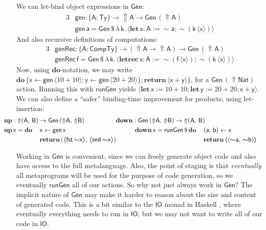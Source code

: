 \documentclass[acmsmall,screen]{acmart}
\newcommand{\mit}[1]{{\mathsf{#1}}}
\newcommand{\msf}[1]{{\mathsf{#1}}}
\newcommand{\mbf}[1]{{\mathbf{#1}}}
\newcommand{\bs}[1]{\boldsymbol{#1}}
\newcommand{\mdo}{\mbf{do}\,}
\newcommand{\ind}{\hspace{1em}}
\newcommand{\return}{\mbf{return}\,}
\newcommand{\lam}{\lambda\,}
\newcommand{\letrec}{\mbf{letrec}\,}
\newcommand{\letdef}{\mbf{let\,}}
\newcommand{\vk}{\mathsf{k}}
\newcommand{\vA}{\mathsf{A}}
\newcommand{\vB}{\mathsf{B}}
\newcommand{\va}{\mathsf{a}}
\newcommand{\vb}{\mathsf{b}}
\newcommand{\vx}{\mathsf{x}}
\newcommand{\vy}{\mathsf{y}}
\newcommand{\vf}{\mathsf{f}}
\newcommand{\fro}{\leftarrow}
\newcommand{\Up}{{\Uparrow}}
\newcommand{\spl}{{\bs{\sim}}}
\newcommand{\ql}{{\bs{\langle}}}
\newcommand{\qr}{{\bs{\rangle}}}
\newcommand{\Ty}{\msf{Ty}}
\newcommand{\CTy}{\msf{CompTy}}
\newcommand{\fst}{\msf{fst}}
\newcommand{\snd}{\msf{snd}}
\newcommand{\Nat}{\msf{Nat}}
\theoremstyle{remark}
\newcommand{\mup}{\mbf{up}}
\newcommand{\mdown}{\mbf{down}}
\newcommand{\Gen}{\msf{Gen}}
\newcommand{\gen}{\mit{gen}}
\newcommand{\genRec}{\mit{genRec}}
\newcommand{\runGen}{\mit{runGen}}
\newcommand{\qt}[1]{\ql#1\qr}
\newcommand{\dlr}{\,\$\,}
\begin{document}
We can let-bind object expressions in $\Gen$:
\begin{alignat*}{3}
  & \gen : \{\vA : \Ty\} \to \Up \vA \to \Gen\,(\Up \vA) \\
  & \gen\,\va = \Gen \dlr \lam \vk.\,\ql \letdef \vx : \vA := \spl \va; \spl(\vk\,\ql \vx \qr) \qr
\end{alignat*}
And also recursive definitions of computations:
\begin{alignat*}{3}
  & \genRec : \{\vA : \CTy\} \to (\Up \vA \to \Up \vA) \to \Gen\,(\Up \vA) \\
  & \genRec\,\vf = \Gen \dlr \lam \vk.\,\qt{\letrec \vx : \vA := \spl(\vf\,\qt{\vx}); \spl(\vk\,\qt{\vx})}
\end{alignat*}
Now, using $\mbf{do}$-notation, we may write $\mdo \{\vx \fro \gen\,\qt{10 + 10}; \vy \fro
\gen\,\qt{20 + 20}\};\return \qt{\vx + \vy}\}$, for a $\Gen\,(\Up \Nat)$
action. Running this with $\runGen$ yields $\qt{\letdef \vx := 10 + 10; \letdef \vy
  := 20 + 20; \vx + \vy}$. We can also define a ``safer'' binding-time improvement for
products, using let-insertion:
\begin{alignat*}{6}
  &\hspace{-2em}\mathrlap{\mup : \Up (\vA,\,\vB) \to \Gen\,(\Up \vA,\,\Up \vB)             \hspace{5em} \mdown : \Gen\,(\Up \vA,\, \Up \vB) \to \Up(\vA,\,\vB)} \\
  &\hspace{-2em}\mup\,\vx = \mdo &&\vx \fro \gen\,\vx                                    && \ind\ind \mdown\,\vx = \runGen \dlr \mdo &&(\va,\,\vb) \fro \vx\\
  &\hspace{-2em}               &&\return (\qt{\fst\,\spl \vx},\,\qt{\snd\,\spl \vx})     &&                           &&\return \qt{(\spl \va,\, \spl \vb)}
\end{alignat*}

Working in $\Gen$ is convenient, since we can freely generate object code and
also have access to the full metalanguage. Also, the point of staging is that
\emph{eventually} all metaprograms will be used for the purpose of code
generation, so we eventually $\runGen$ all of our actions. So why not just
always work in $\Gen$? The implicit nature of $\Gen$ may make it harder to
reason about the size and content of generated code. This is a bit similar to
the $\msf{IO}$ monad in Haskell \cite{jones2001tackling}, where eventually
everything needs to run in $\msf{IO}$, but we may not want to write all of our
code in $\msf{IO}$.
\end{document}

